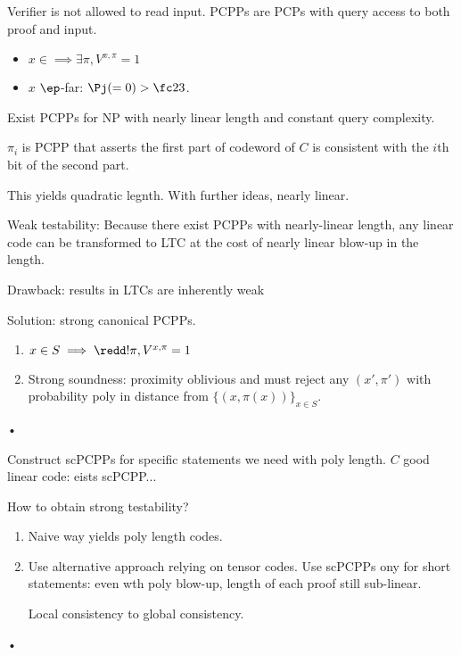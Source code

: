 \begin{df}
Verifier is not allowed to read input. PCPPs are PCPs with query access to both proof and input.

\begin{itemize}
\item
$x\in \implies \exists \pi, V^{x,\pi}=1$
\item
$x$ $\ep$-far: $\Pj(=0)>\fc 23$.
\end{itemize}
\end{df}
Exist PCPPs for NP with nearly linear length and constant query complexity.

$\pi_i$ is PCPP that asserts the first part of codeword of $C$ is consistent with the $i$th bit of the second part.

This yields quadratic legnth. With further ideas, nearly linear.

Weak testability: Because there exist PCPPs with nearly-linear length, 
any linear code can be transformed to LTC at the cost of nearly linear blow-up in the length. 

Drawback: results in LTCs are inherently weak

Solution: strong canonical PCPPs. 
\begin{enumerate}
\item
$x\in S\implies \redd!\pi, V^{x,\pi}=1$
\item
Strong soundness: proximity oblivious and must reject any $(x',\pi')$ with probability poly in distance from $\{(x,\pi(x))\}_{x\in S}$. %
\end{enumerate}•

Construct scPCPPs for specific statements we need with poly length. $C$ good linear code: eists scPCPP...

How to obtain strong testability?
\begin{enumerate}
\item
Naive way yields poly length codes.
\item Use alternative approach relying on tensor codes.
Use scPCPPs ony for short statements: even wth poly blow-up, length of each proof still sub-linear.

Local consistency to global consistency.
\end{enumerate}•

